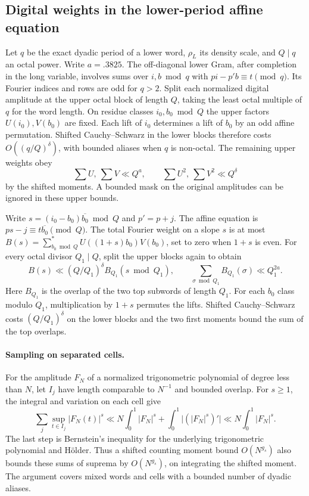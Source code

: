 \documentclass[11pt,a4paper]{article}
\theoremstyle{paperplain}
\numberwithin{equation}{section}
\begin{document}
\subsection{Digital weights in the lower-period affine equation}
\label{sec:ordinary-group-gram-twists}

Let $q$ be the exact dyadic period of a lower word, $\rho_L$ its
density scale, and $Q\mid q$ an octal power. Write $a=.3825$.
The off-diagonal lower Gram, after completion in the long variable,
involves sums over $i,b\bmod q$ with $pi-p'b\equiv t\pmod q$.
Its Fourier indices and rows are odd for $q>2$.
Split each normalized digital amplitude at the upper octal block of
length $Q$, taking the least octal multiple of $q$ for the word length.
On residue classes $i_0,b_0\bmod Q$ the upper factors $U(i_0),V(b_0)$
are fixed. Each lift of $i_0$ determines a lift of $b_0$ by an odd
affine permutation. Shifted Cauchy--Schwarz in the lower blocks
therefore costs $O((q/Q)^\delta)$, with bounded aliases when $q$ is
non-octal. The remaining upper weights obey
\[
 \sum U,\ \sum V\ll Q^a,\qquad \sum U^2,\ \sum V^2\ll Q^\delta
\]
by the shifted moments. A bounded mask on the original amplitudes
can be ignored in these upper bounds.

Write $s=(i_0-b_0)\overline{b_0}\bmod Q$ and
$p'=p+j$. The affine equation is $ps-j\equiv t\overline{b_0}\pmod Q$.
The total Fourier weight on a slope $s$ is at most
$B(s)=\sum_{b_0\bmod Q}^{*}U((1+s)b_0)V(b_0)$, set to zero when
$1+s$ is even. For every octal divisor $Q_1\mid Q$, split the upper
blocks again to obtain
\begin{equation}\label{eq:ordinary-group-gram-overlap}
 B(s)\ll (Q/Q_1)^\delta B_{Q_1}(s\bmod Q_1),\qquad
       \sum_{\sigma\bmod Q_1}B_{Q_1}(\sigma)\ll Q_1^{2a}.
\end{equation}
Here $B_{Q_1}$ is the overlap of the two top subwords of length $Q_1$.
For each $b_0$ class modulo $Q_1$, multiplication by $1+s$ permutes
the lifts. Shifted Cauchy--Schwarz costs $(Q/Q_1)^\delta$ on the lower
blocks and the two first moments bound the sum of the top overlaps.


\paragraph{Sampling on separated cells.}\label{sec:zero-model-wide-source-bands}
For the amplitude $F_N$ of a normalized trigonometric polynomial of degree less than $N$,
let $I_j$ have length comparable to $N^{-1}$ and bounded overlap.
For $s\ge1$, the integral and variation on each cell give
\[
 \sum_j\sup_{t\in I_j}|F_N(t)|^s
 \ll N\int_0^1 |F_N|^s+\int_0^1\big|(|F_N|^s)'\big|
 \ll N\int_0^1 |F_N|^s .
\]
The last step is Bernstein's inequality for the underlying
trigonometric polynomial and H\"older. Thus a shifted counting
moment bound $O(N^{g_s})$ also bounds these sums of suprema by
$O(N^{g_s})$, on integrating the shifted moment. The argument covers
mixed words and cells with a bounded number of dyadic aliases.
\end{document}
